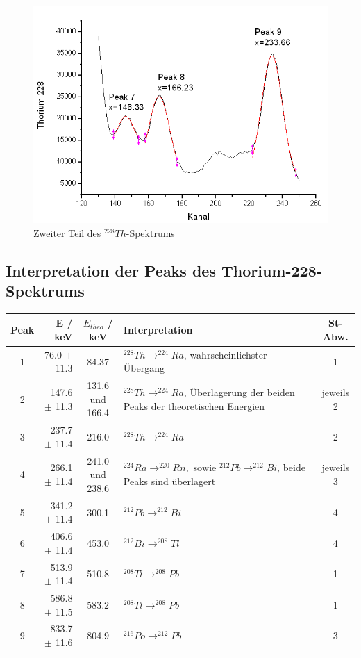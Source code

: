\begin{figure}[H]
\centering \includegraphics[width = \textwidth]{auswertung/Th2.png}
\caption{Zweiter Teil des $^{228}Th$-Spektrums}
\end{figure}

\subsection{Interpretation der Peaks des Thorium-228-Spektrums}

\begin{center}
\begin{tabular}{| c | r | c | p{6cm} | c |} \hline
Peak & E / keV & $E_{theo}$ / keV & Interpretation &St-Abw. \\ \hline
1 & 76.0 $\pm$ 11.3  & 84.37 & $^{228}Th \rightarrow ^{224}Ra$, wahrscheinlichster Übergang & 1 \\
2 & 147.6 $\pm$ 11.3 & 131.6 und 166.4 & $^{228}Th \rightarrow ^{224}Ra$, Überlagerung der beiden Peaks der theoretischen Energien & jeweils 2\\
3 & 237.7 $\pm$ 11.4 & 216.0 & $^{228}Th \rightarrow ^{224}Ra$ & 2\\
4 & 266.1 $\pm$ 11.4 & 241.0 und 238.6 & $^{224}Ra \rightarrow ^{220}Rn, \text{\ \ sowie \ \ } ^{212}Pb \rightarrow ^{212}Bi$, beide Peaks sind überlagert & jeweils 3\\
5 & 341.2 $\pm$ 11.4 & 300.1 & $^{212}Pb \rightarrow ^{212}Bi$ & 4\\
6 & 406.6 $\pm$ 11.4 & 453.0 & $^{212}Bi \rightarrow ^{208}Tl$ & 4\\
7 & 513.9 $\pm$ 11.4 & 510.8 & $^{208}Tl \rightarrow ^{208}Pb$ & 1\\
8 & 586.8 $\pm$ 11.5 & 583.2 & $^{208}Tl \rightarrow ^{208}Pb$ & 1\\
9 & 833.7 $\pm$ 11.6 & 804.9 & $^{216}Po \rightarrow ^{212}Pb$ & 3\\ \hline
\end{tabular}
\end{center}

